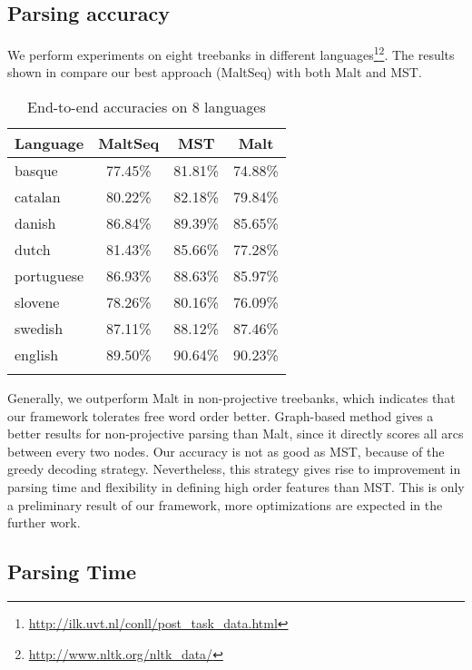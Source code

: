 \subsection{Parsing accuracy}
We perform experiments on eight treebanks in different 
languages\footnote{\url{http://ilk.uvt.nl/conll/post_task_data.html}}\footnote{\url{http://www.nltk.org/nltk_data/}}.
The results shown in  compare our best approach
(MaltSeq) with both Malt and MST.
\begin{table}[ht]
\small
    \centering
    \caption{End-to-end accuracies on 8 languages}
    \begin{tabular}{l|ccc}
        \whline
        Language & MaltSeq & MST & Malt \\
        \hline
        basque & 77.45\% & 81.81\% & 74.88\% \\
        catalan & 80.22\% & 82.18\% & 79.84\% \\
        danish & 86.84\% & 89.39\% & 85.65\% \\
        dutch & 81.43\% & 85.66\% & 77.28\% \\
        portuguese & 86.93\% & 88.63\% & 85.97\% \\
        slovene & 78.26\% & 80.16\% & 76.09\% \\
        swedish & 87.11\% & 88.12\% & 87.46\% \\
        english & 89.50\% & 90.64\% & 90.23\% \\
        \whline
    \end{tabular}%
    \label{tab:multilingual test}%
\end{table}%
Generally, we outperform Malt in non-projective treebanks, 
which indicates that our framework tolerates free word order better. 
Graph-based method gives a better results for non-projective parsing 
than Malt, since it directly scores all arcs between every two nodes. 
Our accuracy is not as good as MST, because of the greedy decoding strategy.
Nevertheless, this strategy gives rise to improvement in 
parsing time and flexibility in defining high order features than MST.
This is only a preliminary result of our framework, more optimizations 
are expected in the further work.

\subsection{Parsing Time}

